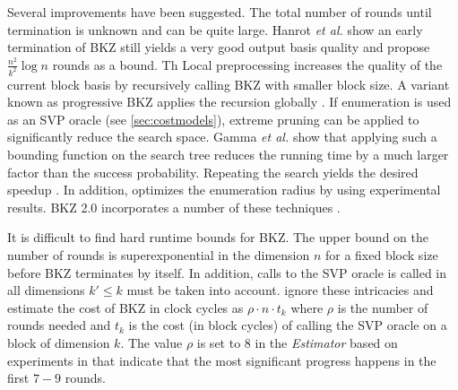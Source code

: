 Several improvements have been suggested. The total number of rounds until termination is unknown and can be quite large. Hanrot \textit{et al.} \cite{HPS11a} show an early termination of BKZ still yields a very good output basis quality and propose $\frac{n^2}{k^2} \log n$ rounds as a bound. Th
Local preprocessing increases the quality of the current block basis by recursively calling BKZ with smaller block size. A variant known as progressive BKZ applies the recursion globally \cite{AWHT16}. If enumeration is used as an SVP oracle (see \cref{sec:costmodels}), extreme pruning can be applied to significantly reduce the search space. Gamma \textit{et al.} show that applying such a bounding function on the search tree reduces the running time by a much larger factor than the success probability. Repeating the search yields the desired speedup \cite{GNR10}. In addition, \cite{CN11} optimizes the enumeration radius by using experimental results. BKZ 2.0 incorporates a number of these techniques \cite{CN11}.


It is difficult to find hard runtime bounds for BKZ. The upper bound on the number of rounds is superexponential in the dimension $n$ for a fixed block size \cite{HPS11a, GN08b} before BKZ terminates by itself. In addition, calls to the SVP oracle is called in all dimensions $k' \leq k$ must be taken into account. 
\citet{APS15} ignore these intricacies and estimate the cost of BKZ in clock cycles as $\rho \cdot n \cdot t_k$ where $\rho$ is the number of rounds needed and $t_k$ is the cost (in block cycles) of calling the SVP oracle on a block of dimension $k$. The value $\rho$ is set to $8$ in the \textit{Estimator} based on experiments in \cite{Chen13} that indicate that the most significant progress happens in the first $7-9$ rounds. 


